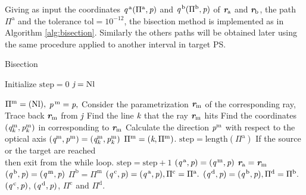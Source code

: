 Giving as input the coordinates $\textit{q}^{\,\textrm{a}}(\Pi^{\textrm{a}}, \textit{p})$ and $\textit{q}^{\,\textrm{b}}(\Pi^{\textrm{b}}, \textit{p})$ of $\textit{\textbf{r}}_{\textrm{a}}$ and $\textit{\textbf{r}}_{\textrm{b}}$, the path $\Pi^\textrm{a}$ and the tolerance $\textrm{tol}= 10^{-12}$, the bisection method is implemented as in Algorithm \ref{alg:bisection}. Similarly the others paths will be obtained later using the same procedure applied to another interval in target PS.
\begin{algorithm}
\caption{Bisection}\label{alg:bisection}
Initialize $\textrm{step} = 0$ $\textit{j} = \textrm{Nl}$
\begin{algorithmic}[1]
\State $\Pi^{\textrm{m}}= (\textrm{Nl}),$
\State $\textit{p}^{\,\textrm{m}}=\textit{p},$
\State Consider the parametrization $\textit{\textbf{r}}_{\textrm{m}}$ of the corresponding ray,
\State Trace back $\textit{\textbf{r}}_{\textrm{m}}$ from $\textit{j}$
\State Find the line $\textit{k}$ that the ray $\textit{\textbf{r}}_{\textrm{m}}$ hits 
\State Find the coordinates $(\textit{q}^{\textrm{m}}_{\textit{k}}, \textit{p}^{\textrm{m}}_{\textit{k}})$ in  corresponding to $\textit{\textbf{r}}_{\textrm{m}}$
\State Calculate the direction $\textit{p}^{\textrm{m}}$ with respect to the optical axis
\State $(\textit{q}^{\textrm{m}}, \textit{p}^{\textrm{m}}) = (\textit{q}^{\textrm{m}}_{\textit{k}}, \textit{p}^{\textrm{m}}_{\textit{k}})$
\State $\Pi^{\textrm{m}}=(\textit{k},\Pi^{\textrm{m}})$.
\State $\textrm{step} = \mbox{length}(\Pi^\textrm{a})$ \Comment If the source or the target are reached \\  \Comment then exit from the while loop.
\Else \State $\textrm{step}=\textrm{step}+1$ 
\EndIf
\EndWhile
{}
\State $(\textit{q}^{\,\textrm{a}}, \textit{p})= (\textit{q}^{\,\textrm{m}}, \textit{p})$
\State $\textit{\textbf{r}}_{\textrm{a}}= \textit{\textbf{r}}_{\textrm{m}}$
\Else 
\State $(\textit{q}^{\,\textrm{b}}, \textit{p})= (\textit{q}^{\,\textrm{m}}, \textit{p})$
\State $\Pi^\textrm{b} =  \Pi^{\textrm{m}}$
\EndIf
\EndWhile
\State $(\textit{q}^{\,\textrm{c}}, \textit{p})= (\textit{q}^{\,\textrm{a}}, \textit{p}), \Pi^\textrm{c}= \Pi^{\textrm{a}}.$
\State $(\textit{q}^{\,\textrm{d}}, \textit{p})= (\textit{q}^{\,\textrm{b}}, \textit{p}), \Pi^\textrm{d}= \Pi^{\textrm{b}}.$
\State \Return $(\textit{q}^{\,\textrm{c}}, \textit{p})$, $(\textit{q}^{\,\textrm{d}}, \textit{p})$, $\Pi^{\textrm{c}}$ and $\Pi^{\textrm{d}}$.
\end{algorithmic}
\end{algorithm}
